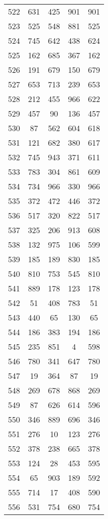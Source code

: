 \documentclass[a4paper,10pt,ngerman]{scrartcl}
\begin{document}
\begin{longtable}[c]{c|c|c|c|c}
    522 & 631 & 425 & 901 & 901 \\
    523 & 525 & 548 & 881 & 525 \\
    524 & 745 & 642 & 438 & 624 \\
    525 & 162 & 685 & 367 & 162 \\
    526 & 191 & 679 & 150 & 679 \\
    527 & 653 & 713 & 239 & 653 \\
    528 & 212 & 455 & 966 & 622 \\
    529 & 457 & 90 & 136 & 457 \\
    530 & 87 & 562 & 604 & 618 \\
    531 & 121 & 682 & 380 & 617 \\
    532 & 745 & 943 & 371 & 611 \\
    533 & 783 & 304 & 861 & 609 \\
    534 & 734 & 966 & 330 & 966 \\
    535 & 372 & 472 & 446 & 372 \\
    536 & 517 & 320 & 822 & 517 \\
    537 & 325 & 206 & 913 & 608 \\
    538 & 132 & 975 & 106 & 599 \\
    539 & 185 & 189 & 830 & 185 \\
    540 & 810 & 753 & 545 & 810 \\
    541 & 889 & 178 & 123 & 178 \\
    542 & 51 & 408 & 783 & 51 \\
    543 & 440 & 65 & 130 & 65 \\
    544 & 186 & 383 & 194 & 186 \\
    545 & 235 & 851 & 4 & 598 \\
    546 & 780 & 341 & 647 & 780 \\
    547 & 19 & 364 & 87 & 19 \\
    548 & 269 & 678 & 868 & 269 \\
    549 & 87 & 626 & 614 & 596 \\
    550 & 346 & 889 & 696 & 346 \\
    551 & 276 & 10 & 123 & 276 \\
    552 & 378 & 238 & 665 & 378 \\
    553 & 124 & 28 & 453 & 595 \\
    554 & 65 & 903 & 189 & 592 \\
    555 & 714 & 17 & 408 & 590 \\
    556 & 531 & 754 & 680 & 754 \\

\end{longtable}
\end{document}
